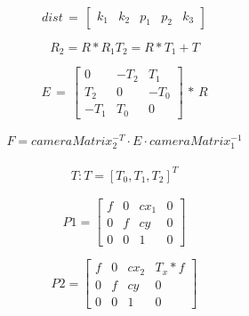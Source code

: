 \begin{equation}\label{eq:dist}
dist\,=\,\begin{bmatrix}
k_1 & k_2 & p_1 & p_2 & k_3
\end{bmatrix}
\end{equation}

\begin{equation}\label{eq:1} R_2=R*R_1T_2=R*T_1 + T \end{equation}

\begin{equation}\label{eq:2}
E\,=\,\begin{bmatrix}
{0} & {-T_2} & {T_1}\\
{T_2} & {0} & {-T_0}\\
{-T_1} & {T_0} & {0} 
\end{bmatrix}\,*\,R
\end{equation}

\begin{align*}
F = cameraMatrix_2^{-T}\cdot E\cdot cameraMatrix_1^{-1} 
\end{align*}

\begin{align*}
T : T=[T_0, T_1, T_2]^T  
\end{align*}

\begin{equation}\label{eq:P1}
P1 = \begin{bmatrix} f & 0 & cx_1 & 0 \\ 0 & f & cy & 0 \\ 0 & 0 & 1 & 0 \end{bmatrix}
\end{equation}

\begin{equation}\label{eq:P2}
P2 = \begin{bmatrix} f & 0 & cx_2 & T_x*f \\ 0 & f & cy & 0 \\ 0 & 0 & 1 & 0 \end{bmatrix}
\end{equation}

